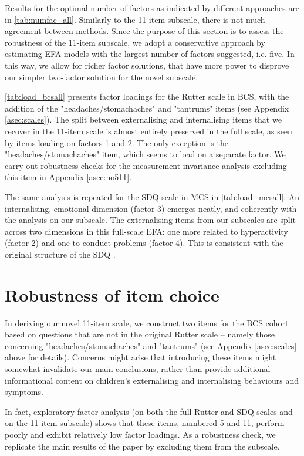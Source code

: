 Results for the optimal number of factors as indicated by different approaches are in \autoref{tab:numfac_all}. Similarly to the 11-item subscale, there is not much agreement between methods. Since the purpose of this section is to assess the robustness of the 11-item subscale, we adopt a conservative approach by estimating EFA models with the largest number of factors suggested, i.e. five. In this way, we allow for richer factor solutions, that have more power to disprove our simpler two-factor solution for the novel subscale.

\autoref{tab:load_bcsall} presents factor loadings for the Rutter scale in BCS, with the addition of the "headaches/stomachaches" and "tantrums" items (see Appendix \autoref{asec:scales}). The split between externalising and internalising items that we recover in the 11-item scale is almost entirely preserved in the full scale, as seen by items loading on factors 1 and 2. The only exception is the "headaches/stomachaches" item, which seems to load on a separate factor. We carry out robustness checks for the measurement invariance analysis excluding this item in Appendix \autoref{asec:no511}.

The same analysis is repeated for the SDQ scale in MCS in \autoref{tab:load_mcsall}. An internalising, emotional dimension (factor 3) emerges neatly, and coherently with the analysis on our subscale. The externalising items from our subscales are split across two dimensions in this full-scale EFA: one more related to hyperactivity (factor 2) and one to conduct problems (factor 4). This is consistent with the original structure of the SDQ \citep{Goodman1997}.


\section{Robustness of item choice}\label{asec:no511}

In deriving our novel 11-item scale, we construct two items for the BCS cohort based on questions that are not in the original Rutter scale -- namely those concerning "headaches/stomachaches" and "tantrums" (see Appendix \autoref{asec:scales} above for details). Concerns might arise that introducing these items might somewhat invalidate our main conclusions, rather than provide additional informational content on children's externalising and internalising behaviours and symptoms.

In fact, exploratory factor analysis (on both the full Rutter and SDQ scales and on the 11-item subscale) shows that these items, numbered 5 and 11, perform poorly and exhibit relatively low factor loadings. As a robustness check, we replicate the main results of the paper by excluding them from the subscale.

